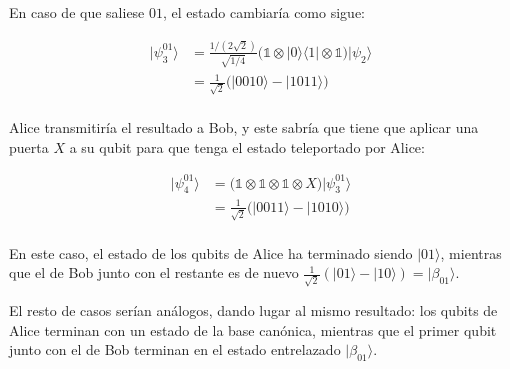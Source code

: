 \documentclass{article}
\begin{document}
En caso de que saliese $01$, el estado cambiaría como sigue:

\begin{align*}
  |\psi_3^{01}\rangle 
        &= \frac{1/(2\sqrt{2})}{\sqrt{1/4}}\Big(
          \mathbb{1}
          \otimes |0 \rangle\langle 1|
          \otimes \mathbb{1}
          \Big)|\psi_2\rangle \\ 
        &= \frac{1}{\sqrt{2}}\Big(
          |0010\rangle 
          - |1011\rangle 
        \Big) \\ 
\end{align*}

Alice transmitiría el resultado a Bob, y este sabría que tiene que
aplicar una puerta $X$ a su qubit para que tenga el estado
teleportado por Alice:

\begin{align*}
  |\psi_4^{01}\rangle 
        &= \Big(
          \mathbb{1}
          \otimes \mathbb{1}
          \otimes \mathbb{1}
          \otimes X
          \Big)|\psi_3^{01}\rangle \\ 
        &= \frac{1}{\sqrt{2}}\Big(
          |0011\rangle 
          - |1010\rangle 
        \Big) \\ 
\end{align*}

En este caso, el estado de los qubits de Alice ha terminado siendo
$|01\rangle$, mientras que el de Bob junto con el restante es de
nuevo $\frac{1}{\sqrt{2}}(|01\rangle - |10\rangle)
= |\beta_{01}\rangle$.

El resto de casos serían análogos, dando lugar al mismo resultado:
los qubits de Alice terminan con un estado de la base canónica,
mientras que el primer qubit junto con el de Bob terminan en el
estado entrelazado $|\beta_{01}\rangle$.
\end{document}
